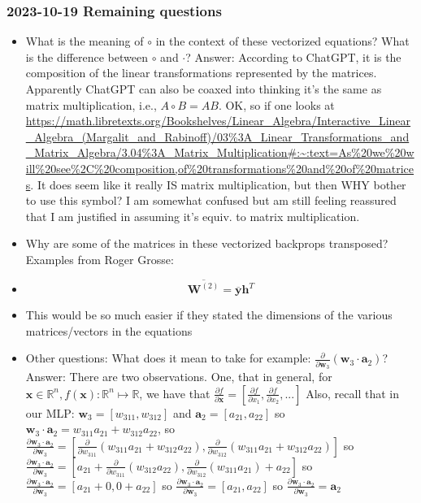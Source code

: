 \documentclass{article}
\begin{document}
\subsubsection{2023-10-19 Remaining questions}
\begin{itemize}
    \item What is the meaning of $\circ$ in the context of these vectorized equations? What is the difference between $\circ$ and $\cdot$?
    Answer: According to ChatGPT, it is the composition of the linear transformations represented by the matrices.
    Apparently ChatGPT can also be coaxed into thinking it's the same as matrix multiplication, i.e., $A \circ B = AB$.
    OK, so if one looks at  \url{https://math.libretexts.org/Bookshelves/Linear_Algebra/Interactive_Linear_Algebra_(Margalit_and_Rabinoff)/03%3A_Linear_Transformations_and_Matrix_Algebra/3.04%3A_Matrix_Multiplication#:~:text=As%20we%20will%20see%2C%20composition,of%20transformations%20and%20of%20matrices}.
    It does seem like it really IS matrix multiplication, but then WHY bother to use this symbol? I am somewhat confused but am still feeling reassured that 
    I am justified in assuming it's equiv. to matrix multiplication.
    \item Why are some of the matrices in these vectorized backprops transposed? Examples from Roger Grosse:
    \item \[ \overline{\bm{W}^{(2)}} = \overline{\bm{y}}\bm{h}^{T} \]
    \item This would be so much easier if they stated the dimensions of the various matrices/vectors in the equations
    \item Other questions: What does it mean to take for example: $\frac{\partial}{\partial{\bm{w}_3}} (\bm{w}_3 \cdot \bm{a}_2)$?
    Answer: There are two observations. One, that in general, for $\bm{x} \in \mathbb{R}^n, f(\bm{x}): \mathbb{R}^n \mapsto \mathbb{R}$,
    we have that $\frac{\partial{f}}{\partial{\bm{x}}} = [\frac{\partial{f}}{\partial{x_1}}, \frac{\partial{f}}{\partial{x_2}}, ...]$
    Also, recall that in our MLP: $\bm{w}_3 = [w_{311}, w_{312}]$ and $\bm{a}_2 = [a_{21}, a_{22}]$
    so $\bm{w}_3 \cdot \bm{a}_2 = w_{311}a_{21} + w_{312}a_{22}$, 
    so $\frac{\partial{\bm{w}_3 \cdot \bm{a}_2}}{\partial{\bm{w}_3}} = [\frac{\partial{}}{\partial{w_{311}}} (w_{311}a_{21} + w_{312}a_{22}), \frac{\partial}{\partial{w_{312}}}(w_{311}a_{21} + w_{312}a_{22})]$
    so $\frac{\partial{\bm{w}_3 \cdot \bm{a}_2}}{\partial{\bm{w}_3}} = [a_{21} + \frac{\partial}{\partial{w_{311}}}(w_{312}a_{22}), \frac{\partial}{\partial{w_{312}}}(w_{311}a_{21}) + a_{22}]$
    so $\frac{\partial{\bm{w}_3 \cdot \bm{a}_2}}{\partial{\bm{w}_3}} = [a_{21} + 0, 0 + a_{22}]$
    so $\frac{\partial{\bm{w}_3 \cdot \bm{a}_2}}{\partial{\bm{w}_3}} = [a_{21},a_{22}]$
    so $\frac{\partial{\bm{w}_3 \cdot \bm{a}_2}}{\partial{\bm{w}_3}} = \bm{a}_2$
\end{itemize}
\end{document}
